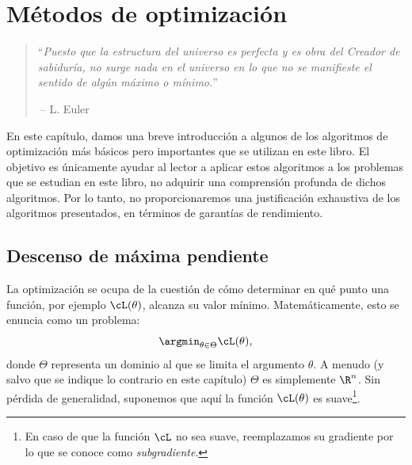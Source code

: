 \documentclass[../../book-main_es.tex]{subfiles}
\begin{document}
\chapter{Métodos de optimización}
\label{app:optimization}

\begin{quote}
    ``{\em Puesto que la estructura del universo es perfecta y es obra 
        del Creador de sabiduría, no surge nada en el universo 
        en lo que no se manifieste el sentido de algún máximo o mínimo.}''

    $~$\hfill -- L. Euler
\end{quote}
\vspace{5mm}

En este capítulo, damos una breve introducción a algunos de los
algoritmos de optimización más básicos pero importantes que se utilizan en este libro. El
objetivo es únicamente ayudar al lector a aplicar estos algoritmos a los problemas
que se estudian en este libro, no adquirir una comprensión profunda de dichos
algoritmos. Por lo tanto, no proporcionaremos una justificación exhaustiva de
los algoritmos presentados, en términos de garantías de rendimiento.

\section{Descenso de máxima pendiente}

La optimización se ocupa de la cuestión de cómo determinar en qué punto una
función, por ejemplo \(\cL(\theta)\), alcanza su valor mínimo.
Matemáticamente, esto se enuncia como un problema:
\begin{equation}
    \argmin_{\theta \in \Theta} \cL(\theta),
\end{equation}
donde \(\Theta\) representa un dominio al que se limita el argumento \(\theta\).
A menudo (y salvo que se indique lo contrario en este capítulo)
\(\Theta\) es simplemente \(\R^{n}\). Sin pérdida de generalidad,
suponemos que aquí la función \(\cL(\theta)\) es suave\footnote{En
    caso de que la función \(\cL\) no sea suave, reemplazamos su gradiente por
lo que se conoce como \textit{subgradiente}.}.
\end{document}

